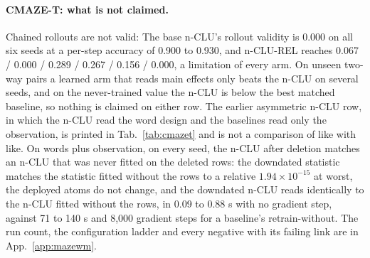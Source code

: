 \documentclass{article} %
\newcommand{\sci}[2]{\ensuremath{#1\times10^{#2}}}
\begin{document}
\paragraph{CMAZE-T: what is not claimed.} Chained rollouts are not valid: The base n-CLU's rollout validity
is 0.000 on all six seeds at a per-step accuracy of 0.900 to 0.930, and n-CLU-REL reaches 0.067 /
0.000 / 0.289 / 0.267 / 0.156 / 0.000, a limitation of every arm. On unseen two-way pairs a learned
arm that reads main effects only beats the n-CLU on several seeds, and on the never-trained value the
n-CLU is below the best matched baseline, so nothing is claimed on either row. The earlier asymmetric
n-CLU row, in which the n-CLU read the word design and the baselines read only the observation, is
printed in Tab.~\ref{tab:cmazet} and is not a comparison of like with like. On words plus
observation, on every seed, the n-CLU after deletion matches an n-CLU that was never fitted on the
deleted rows: the downdated statistic matches the statistic fitted without the rows to a relative
\sci{1.94}{-15} at worst, the deployed atoms do not change, and the downdated n-CLU reads identically
to the n-CLU fitted without the rows, in 0.09 to 0.88 s with no gradient step,
against 71 to 140 s and 8,000 gradient steps for a baseline's retrain-without.
The run count, the configuration ladder and every negative with its failing link are in
App.~\ref{app:mazewm}.

\end{document}
